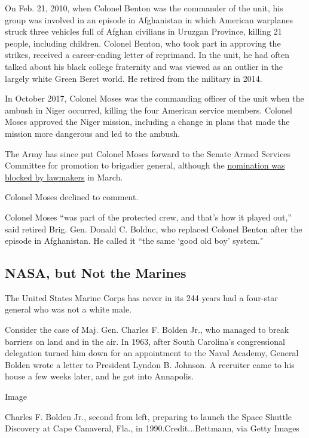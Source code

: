 On Feb. 21, 2010, when Colonel Benton was the commander of the unit, his
group was involved in an episode in Afghanistan in which American
warplanes struck three vehicles full of Afghan civilians in Uruzgan
Province, killing 21 people, including children. Colonel Benton, who
took part in approving the strikes, received a career-ending letter of
reprimand. In the unit, he had often talked about his black college
fraternity and was viewed as an outlier in the largely white Green Beret
world. He retired from the military in 2014.

In October 2017, Colonel Moses was the commanding officer of the unit
when the ambush in Niger occurred, killing the four American service
members. Colonel Moses approved the Niger mission, including a change in
plans that made the mission more dangerous and led to the ambush.

The Army has since put Colonel Moses forward to the Senate Armed
Services Committee for promotion to brigadier general, although the
\href{https://www.nytimes3xbfgragh.onion/2020/03/14/world/africa/niger-ambush-promotion.html}{nomination
was blocked by lawmakers} in March.

Colonel Moses declined to comment.

Colonel Moses ``was part of the protected crew, and that's how it played
out,'' said retired Brig. Gen. Donald C. Bolduc, who replaced Colonel
Benton after the episode in Afghanistan. He called it ``the same `good
old boy' system."

\hypertarget{nasa-but-not-the-marines}{%
\subsection{NASA, but Not the Marines}\label{nasa-but-not-the-marines}}

The United States Marine Corps has never in its 244 years had a
four-star general who was not a white male.

Consider the case of Maj. Gen. Charles F. Bolden Jr., who managed to
break barriers on land and in the air. In 1963, after South Carolina's
congressional delegation turned him down for an appointment to the Naval
Academy, General Bolden wrote a letter to President Lyndon B. Johnson. A
recruiter came to his house a few weeks later, and he got into
Annapolis.

Image

Charles F. Bolden Jr., second from left, preparing to launch the Space
Shuttle Discovery at Cape Canaveral, Fla., in 1990.Credit...Bettmann,
via Getty Images


